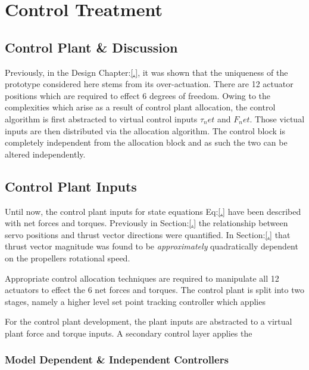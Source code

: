 \chapter{Control Treatment}
\label{ch:control}
\section*{Control Plant \& Discussion}
Previously, in the Design Chapter:\ref{.}, it was shown that the uniqueness of the prototype considered here stems from its over-actuation. There are 12 actuator positions which are required to effect 6 degrees of freedom. Owing to the complexities which arise as a result of control plant allocation, the control algorithm is first abstracted to virtual control inputs $\tau_net$ and $F_net$. Those victual inputs are then distributed via the allocation algorithm. The control block is completely independent from the allocation block and as such the two can be altered independently.
\section{Control Plant Inputs}
\label{sec:control.inputs}
Until now, the control plant inputs for state equations Eq:\ref{.} have been described with net forces and torques. Previously in Section:\ref{.} the relationship between servo positions and thrust vector directions were quantified. In Section:\ref{.} that thrust vector magnitude was found to be \emph{approximately} quadratically dependent on the propellers rotational speed. 
\par
Appropriate control allocation techniques are required to manipulate all 12 actuators to effect the 6 net forces and torques. The control plant is split into two stages, namely a higher level set point tracking controller which applies 

For the control plant development, the plant inputs are abstracted to a virtual plant force and torque inputs. A secondary control layer applies the 
\subsection*{Model Dependent \& Independent Controllers}

